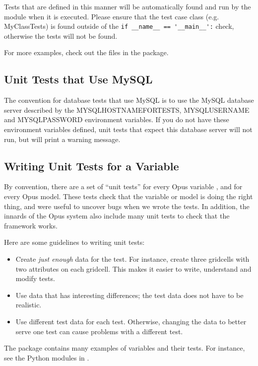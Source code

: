 Tests that are defined in this manner will be automatically found and run by the
 module when it is executed. Please ensure that the test case
class (e.g. MyClassTests) is found outside of the
\verb|if __name__ == '__main__':| check, otherwise the tests will not be found.

For more examples, check out the files in the  package.

\subsection{Unit Tests that Use MySQL}
%
The convention for database tests that use MySQL is to use the MySQL database
server described by the MYSQLHOSTNAMEFORTESTS, MYSQLUSERNAME 
and MYSQLPASSWORD environment variables.  If you do not have these environment
variables defined, unit tests that expect this database server 
will not run, but will print a warning message.

\subsection{Writing Unit Tests for a Variable}
%
By convention, there are a set of ``unit tests'' for every Opus variable
\variablesindex, and for every Opus model.  These tests check that the variable
or model is doing the right thing, and were useful to uncover bugs when we wrote
the tests.  In addition, the innards of the Opus system also include
many unit tests to check that the framework works.

Here are some guidelines to writing unit tests:
\begin{itemize}
  \item Create \emph{just enough} data for the test.  For instance, create
  three gridcells with two attributes \attributesindex on each gridcell.  This
  makes it easier to write, understand and modify tests.
  \item Use data that has interesting differences; the test data does not have
  to be realistic.
  \item Use different test data for each test.  Otherwise, changing the data to
  better serve one test can cause problems with a different test.
\end{itemize}

The  package contains many examples of variables and their
tests.  For instance, see the Python modules in .

